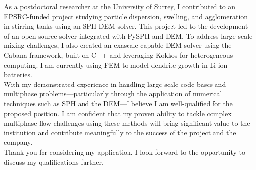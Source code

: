 \documentclass[11pt,a4paper,roman]{moderncv}
\begin{document}
\vspace{1em}
As a postdoctoral researcher at the University of Surrey, I
contributed to an EPSRC-funded project studying particle dispersion,
swelling, and agglomeration in stirring tanks using an SPH-DEM
solver. This project led to the development of an open-source solver
integrated with PySPH and DEM. To address large-scale mixing
challenges, I also created an exascale-capable DEM solver using the
Cabana framework, built on C++ and leveraging Kokkos for heterogeneous
computing. I am currently using FEM to model dendrite growth in Li-ion batteries.\\


\vspace{1em}
With my demonstrated experience in handling large-scale code bases and
multiphase problems—particularly through the application of numerical
techniques such as SPH and the DEM—I believe I am well-qualified for the
proposed position. I am confident that my proven ability to tackle
complex multiphase flow challenges using these methods will bring
significant value to the institution and contribute meaningfully to
the success of the project and the company.\\



\vspace{1em}
Thank you for considering my application. I look forward to the
opportunity to discuss my qualifications further.\\



\vspace{0.5cm}


\makeletterclosing
\end{document}
